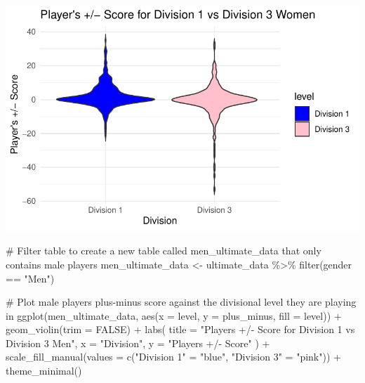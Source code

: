 \documentclass[
  letterpaper,
  DIV=11,
  numbers=noendperiod]{scrartcl}
\newenvironment{Shaded}{\begin{snugshade}}{\end{snugshade}}
\newcommand{\AttributeTok}[1]{\textcolor[rgb]{0.40,0.45,0.13}{#1}}
\newcommand{\CommentTok}[1]{\textcolor[rgb]{0.37,0.37,0.37}{#1}}
\newcommand{\ConstantTok}[1]{\textcolor[rgb]{0.56,0.35,0.01}{#1}}
\newcommand{\FunctionTok}[1]{\textcolor[rgb]{0.28,0.35,0.67}{#1}}
\newcommand{\NormalTok}[1]{\textcolor[rgb]{0.00,0.23,0.31}{#1}}
\newcommand{\OtherTok}[1]{\textcolor[rgb]{0.00,0.23,0.31}{#1}}
\newcommand{\SpecialCharTok}[1]{\textcolor[rgb]{0.37,0.37,0.37}{#1}}
\newcommand{\StringTok}[1]{\textcolor[rgb]{0.13,0.47,0.30}{#1}}
\begin{document}
\includegraphics{final_eda_files/figure-pdf/division-level-&-plus-minus-2.pdf}

\begin{Shaded}
\begin{Highlighting}[]
\CommentTok{\# Filter table to create a new table called men\_ultimate\_data that only contains male players}
\NormalTok{men\_ultimate\_data }\OtherTok{\textless{}{-}}\NormalTok{ ultimate\_data }\SpecialCharTok{\%\textgreater{}\%}
  \FunctionTok{filter}\NormalTok{(gender }\SpecialCharTok{==} \StringTok{"Men"}\NormalTok{)}

\CommentTok{\# Plot male player\textquotesingle{}s plus{-}minus score against the divisional level they are playing in}
\FunctionTok{ggplot}\NormalTok{(men\_ultimate\_data, }\FunctionTok{aes}\NormalTok{(}\AttributeTok{x =}\NormalTok{ level, }\AttributeTok{y =}\NormalTok{ plus\_minus, }\AttributeTok{fill =}\NormalTok{ level)) }\SpecialCharTok{+}
  \FunctionTok{geom\_violin}\NormalTok{(}\AttributeTok{trim =} \ConstantTok{FALSE}\NormalTok{) }\SpecialCharTok{+}
  \FunctionTok{labs}\NormalTok{(}
    \AttributeTok{title =} \StringTok{"Player\textquotesingle{}s +/{-} Score for Division 1 vs Division 3 Men"}\NormalTok{,}
    \AttributeTok{x =} \StringTok{"Division"}\NormalTok{,}
    \AttributeTok{y =} \StringTok{"Player\textquotesingle{}s +/{-} Score"}
\NormalTok{  ) }\SpecialCharTok{+}
  \FunctionTok{scale\_fill\_manual}\NormalTok{(}\AttributeTok{values =} \FunctionTok{c}\NormalTok{(}\StringTok{"Division 1"} \OtherTok{=} \StringTok{"blue"}\NormalTok{, }\StringTok{"Division 3"} \OtherTok{=} \StringTok{"pink"}\NormalTok{)) }\SpecialCharTok{+} 
  \FunctionTok{theme\_minimal}\NormalTok{()}
\end{Highlighting}
\end{Shaded}
\end{document}
